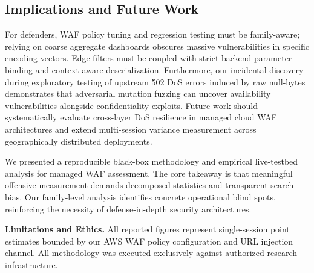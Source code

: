 \subsection{Implications and Future Work}
For defenders, WAF policy tuning and regression testing must be family-aware; relying on coarse aggregate dashboards obscures massive vulnerabilities in specific encoding vectors. Edge filters must be coupled with strict backend parameter binding and context-aware deserialization. Furthermore, our incidental discovery during exploratory testing of upstream 502 DoS errors induced by raw null-bytes demonstrates that adversarial mutation fuzzing can uncover availability vulnerabilities alongside confidentiality exploits. Future work should systematically evaluate cross-layer DoS resilience in managed cloud WAF architectures and extend multi-session variance measurement across geographically distributed deployments.

We presented a reproducible black-box methodology and empirical live-testbed analysis for managed WAF assessment. The core takeaway is that meaningful offensive measurement demands decomposed statistics and transparent search bias. Our family-level analysis identifies concrete operational blind spots, reinforcing the necessity of defense-in-depth security architectures.

\textbf{Limitations and Ethics.} All reported figures represent single-session point estimates bounded by our AWS WAF policy configuration and URL injection channel. All methodology was executed exclusively against authorized research infrastructure.
